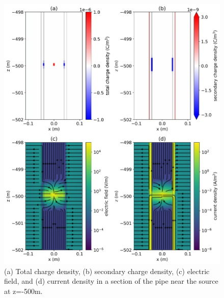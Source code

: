 \begin{figure}
    \begin{center}
    \includegraphics[width=0.7\columnwidth]{figures/casing_software/kaufman_zones.png}
    \end{center}
\caption{(a) Total charge density, (b) secondary charge density, (c) electric field, and (d) current density in a section of the pipe near the source at z=-500m.}
\label{fig:kaufman_zones}
\end{figure}
